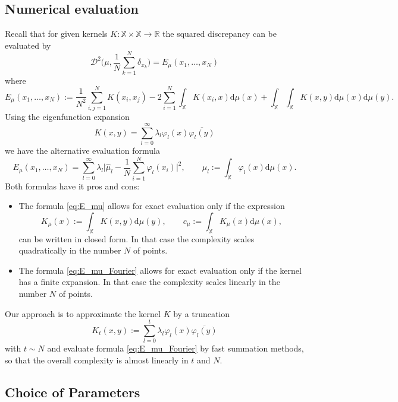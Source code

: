 \documentclass[draft,
a4paper,11pt,DIV=11,%
abstract=on%
]{scrartcl}
\begin{document}
\subsection{Numerical evaluation}
Recall that for given kernels $K:\mathbb X\times \mathbb X \to \mathbb R$ the squared discrepancy can be evaluated by
\[
  \mathscr D^{2}\Big(\mu, \frac 1N \sum_{k=1}^{N} \delta_{x_{k}}\Big) = E_{\mu}(x_{1},\dots,x_{N})
\]
where
\begin{equation}
  \label{eq:E_mu}
  E_{\mu}(x_{1},\dots,x_{N}) :=
    \frac{1}{N^{2}}\sum_{i,j=1}^{N} K(x_{i},x_{j}) - 2\sum_{i=1}^{N} \int_{\mathbb X} K(x_{i},x) \mathrm d\mu(x) + \int_{\mathbb X}\int_{\mathbb X} K(x,y) \mathrm d\mu(x) \mathrm d\mu(y).
  \end{equation}
Using the eigenfunction expansion
\[
 K(x,y) = \sum_{l=0}^{\infty} \lambda_{l} \varphi_{l}(x) \overline{\varphi_{l}(y)} 
\]
we have the alternative evaluation formula
\begin{equation}
  \label{eq:E_mu_Fourier}
  E_{\mu}(x_{1},\dots,x_{N}) = \sum_{l=0}^{\infty} \lambda_{l} \Big| \hat\mu_{l}
  - \frac 1N \sum_{i=1}^{N} \varphi_{l}(x_{i}) \Big|^{2}, \quad\quad \mu_{l} := \int_{\mathbb X} \varphi_{l}(x) \mathrm d\mu(x).
\end{equation}
Both formulas have it pros and cons:
\begin{itemize}
\item The formula \eqref{eq:E_mu} allows for exact evaluation only if the expression
\[
  K_{\mu}(x) := \int_{\mathbb X} K(x,y) \mathrm d\mu(y), \qquad  c_{\mu} := \int_{\mathbb X} K_{\mu}(x) \mathrm d\mu(x),
\]
can be written in closed form. In that case the complexity scales quadratically in the number $N$ of points.

\item The formula \eqref{eq:E_mu_Fourier} allows for exact evaluation only if the kernel has a finite expansion. In that case the complexity scales linearly in the number $N$ of points. 
\end{itemize}
Our approach is to approximate the kernel $K$ by a truncation
\[
  K_{t}(x,y) := \sum_{l=0}^{t} \lambda_{l} \varphi_{l}(x) \overline{\varphi_{l}(y)}
\]
with $t \sim N$ and evaluate formula \eqref{eq:E_mu_Fourier} by fast summation methods, so that the overall complexity is almost linearly in $t$ and $N$. 

\subsection{Choice of Parameters}
\end{document}
